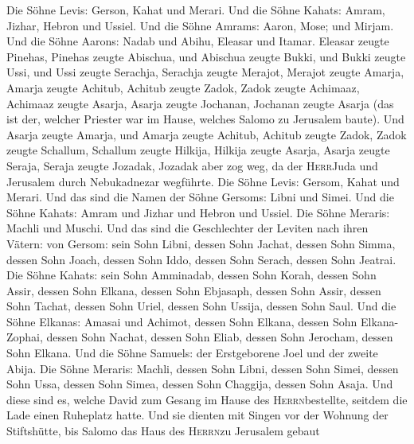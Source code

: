  Die Söhne Levis: Gerson, Kahat und Merari. Und die Söhne
Kahats:  Amram, Jizhar, Hebron und Ussiel. Und die Söhne
Amrams:  Aaron, Mose; und Mirjam. Und die Söhne Aarons:
Nadab und Abihu, Eleasar und Itamar.  Eleasar zeugte
Pinehas, Pinehas zeugte Abischua,  und Abischua zeugte
Bukki, und Bukki zeugte Ussi,  und Ussi zeugte Serachja,
Serachja zeugte Merajot,  Merajot zeugte Amarja, Amarja
zeugte Achitub,  Achitub zeugte Zadok, Zadok zeugte
Achimaaz,  Achimaaz zeugte Asarja, Asarja zeugte Jochanan,
 Jochanan zeugte Asarja (das ist der, welcher Priester
war im Hause, welches Salomo zu Jerusalem baute).  Und
Asarja zeugte Amarja, und Amarja zeugte Achitub, Achitub zeugte Zadok,
 Zadok zeugte Schallum,  Schallum zeugte
Hilkija, Hilkija zeugte Asarja,  Asarja zeugte Seraja,
Seraja zeugte Jozadak,  Jozadak aber zog weg, da der
\textsc{Herr}Juda und Jerusalem durch Nebukadnezar wegführte.
 Die Söhne Levis: Gersom, Kahat und Merari.
 Und das sind die Namen der Söhne Gersoms: Libni und
Simei.  Und die Söhne Kahats: Amram und Jizhar und Hebron
und Ussiel.  Die Söhne Meraris: Machli und Muschi. Und
das sind die Geschlechter der Leviten nach ihren Vätern: von Gersom:
 sein Sohn Libni, dessen Sohn Jachat, dessen Sohn Simma,
 dessen Sohn Joach, dessen Sohn Iddo, dessen Sohn Serach,
dessen Sohn Jeatrai.  Die Söhne Kahats: sein Sohn
Amminadab, dessen Sohn Korah, dessen Sohn Assir,  dessen
Sohn Elkana, dessen Sohn Ebjasaph,  dessen Sohn Assir,
dessen Sohn Tachat, dessen Sohn Uriel, dessen Sohn Ussija, dessen Sohn
Saul.  Und die Söhne Elkanas: Amasai und Achimot,
 dessen Sohn Elkana, dessen Sohn Elkana-Zophai,
 dessen Sohn Nachat, dessen Sohn Eliab, dessen Sohn
Jerocham, dessen Sohn Elkana.  Und die Söhne Samuels: der
Erstgeborene Joel und der zweite Abija.  Die Söhne
Meraris: Machli, dessen Sohn Libni, dessen Sohn Simei, 
dessen Sohn Ussa, dessen Sohn Simea, dessen Sohn Chaggija, dessen Sohn
Asaja.  Und diese sind es, welche David zum Gesang im
Hause des \textsc{Herrn}bestellte, seitdem die Lade einen Ruheplatz
hatte.  Und sie dienten mit Singen vor der Wohnung der
Stiftshütte, bis Salomo das Haus des \textsc{Herrn}zu Jerusalem gebaut
